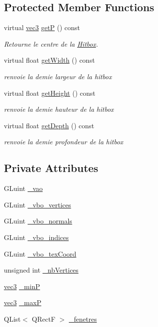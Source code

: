 \subsection*{Protected Member Functions}
\begin{DoxyCompactItemize}
\item 
virtual \hyperlink{structvec3}{vec3} \hyperlink{class_plan_a2561b08d2e0f333c56d7ac2b5cc72fd7}{get\+P} () const 
\begin{DoxyCompactList}\small\item\em Retourne le centre de la \hyperlink{class_hitbox}{Hitbox}. \end{DoxyCompactList}\item 
virtual float \hyperlink{class_plan_aa64cc1ec4e6d1660c691592eb441e00c}{get\+Width} () const 
\begin{DoxyCompactList}\small\item\em renvoie la demie largeur de la hitbox \end{DoxyCompactList}\item 
virtual float \hyperlink{class_plan_a73316993ed03bbf13b38f2dff76b0ced}{get\+Height} () const 
\begin{DoxyCompactList}\small\item\em renvoie la demie hauteur de la hitbox \end{DoxyCompactList}\item 
virtual float \hyperlink{class_plan_a086041dcf2879904e774f34ae4ad61d7}{get\+Depth} () const 
\begin{DoxyCompactList}\small\item\em renvoie la demie profondeur de la hitbox \end{DoxyCompactList}\end{DoxyCompactItemize}
\subsection*{Private Attributes}
\begin{DoxyCompactItemize}
\item 
G\+Luint \hyperlink{class_plan_ab4efe8532b73dd0efca80000afb0027d}{\+\_\+vao}
\item 
G\+Luint \hyperlink{class_plan_a7b203dc36964da663836cf7614fe711a}{\+\_\+vbo\+\_\+vertices}
\item 
G\+Luint \hyperlink{class_plan_aa5db33661be2dfcecf68683c33eb22b9}{\+\_\+vbo\+\_\+normals}
\item 
G\+Luint \hyperlink{class_plan_ad8791ad67d66ac1b24792dc72ec00c64}{\+\_\+vbo\+\_\+indices}
\item 
G\+Luint \hyperlink{class_plan_a3c16becd29f35260b79af8b9cb6fa892}{\+\_\+vbo\+\_\+tex\+Coord}
\item 
unsigned int \hyperlink{class_plan_af3d9228c1b7dc91c0cb00d4c8fa5a550}{\+\_\+nb\+Vertices}
\item 
\hyperlink{structvec3}{vec3} \hyperlink{class_plan_aad9837a269e87fa5d7a4a5fc90abf3e7}{\+\_\+min\+P}
\item 
\hyperlink{structvec3}{vec3} \hyperlink{class_plan_a2dce54e58d00f40ed8da5c9bd34c1232}{\+\_\+max\+P}
\item 
Q\+List$<$ Q\+Rect\+F $>$ \hyperlink{class_plan_aa9fdbf8efac3f80ffd8bb2f789e7f4f2}{\+\_\+fenetres}
\end{DoxyCompactItemize}
